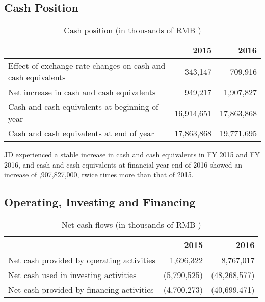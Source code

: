 \subsection{Cash Position}
\begin{table}[H]	
	\begin{center}
		\begin{tabular}{lrr}
			\toprule
			&\textbf{2015}&\textbf{2016}\\
			\midrule
			Effect of exchange rate changes on cash and cash equivalents &	343,147&	709,916\\
			Net increase in cash and cash equivalents &949,217&	1,907,827\\
			Cash and cash equivalents at beginning of year 	&16,914,651&	17,863,868\\
			Cash and cash equivalents at end of year&	17,863,868	&19,771,695\\
			\bottomrule
		\end{tabular}
	\end{center}
	\caption{Cash position (in thousands of RMB \textyen)}\label{table:1}
\end{table}

JD experienced a stable increase in cash and cash equivalents in FY 2015 and FY 2016, and cash and cash equivalents at financial year-end of 2016 showed an increase of ,907,827,000, twice times more than that of 2015.

\subsection{Operating, Investing and Financing}

\begin{table}[H]	
	\begin{center}
		\begin{tabular}{lrr}
			\toprule
			&\textbf{2015}&\textbf{2016}\\
			\midrule
			Net cash provided by operating activities&	1,696,322&	8,767,017\\
			Net cash used in investing activities&	(5,790,525)&	(48,268,577)\\
			Net cash provided by financing activities&	(4,700,273)	&(40,699,471)\\
			\bottomrule
		\end{tabular}
	\end{center}
	\caption{Net cash flows (in thousands of RMB \textyen)}\label{table:1}
\end{table}

